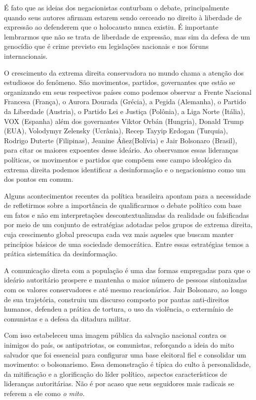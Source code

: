É fato que as ideias dos negacionistas conturbam o debate,
principalmente quando seus autores afirmam estarem sendo cerceado no
direito à liberdade de expressão ao defenderem que o holocausto nunca
existiu. É importante lembrarmos que não se trata de liberdade de
expressão, mas sim da defesa de um genocídio que é crime previsto em
legislações nacionais e nos fóruns internacionais.

O crescimento da extrema direita conservadora no mundo chama a atenção
dos estudiosos do fenômeno. São movimentos, partidos, governantes que
estão se organizando em seus respectivos países como podemos observar a
Frente Nacional Francesa (França), o Aurora Dourada (Grécia), a Pegida
(Alemanha), o Partido da Liberdade (Austria), o Partido Lei e Justiça
(Polônia), a Liga Norte (Itália), VOX (Espanha) além dos governantes
Viktor Orbán (Hungria), Donald Trump (EUA),
Volodymyr Zelensky (Ucrânia), Recep Tayyip Erdogan
(Turquia), Rodrigo Duterte
(Filipinas), Jeanine Áñez(Bolívia) e Jair
Bolsonaro (Brasil), para citar os maiores expoentes desse ideário. Ao
observamos essas lideranças políticas, os movimentos e partidos que
compõem esse campo ideológico da extrema direita podemos identificar a
desinformação e o negacionismo como um dos pontos em comum.

Alguns acontecimentos recentes da política brasileira apontam para a
necessidade de refletirmos sobre a importância de qualificarmos o debate
político com base em fatos e não em interpretações descontextualizadas
da realidade ou falsificadas por meio de um conjunto de estratégias
adotadas pelos grupos de extrema direita, cuja crescimento global
preocupa cada vez mais aqueles que buscam manter princípios básicos de
uma sociedade democrática. Entre essas estratégias temos a prática
sistemática da desinformação.

A comunicação direta com a população é uma das formas empregadas para
que o ideário autoritário prospere e mantenha o maior número de pessoas
sintonizadas com os valores conservadores e até mesmo reacionários. Jair
Bolsonaro, ao longo de sua trajetória, construiu um discurso composto
por pautas anti-direitos humanos, defendeu a prática de tortura, o uso
da violência, o extermínio de comunistas e a defesa da ditadura militar.

Com isso estabeleceu uma imagem pública da salvação nacional contra os
inimigos do país, os antipatriotas, os comunistas, reforçando a ideia do
mito salvador que foi essencial para configurar uma base eleitoral fiel
e consolidar um movimento: o bolsonarismo. Essa demonstração é típica do
culto à personalidade, da mitificação e a glorificação do líder
político, aspectos característicos de lideranças autoritárias. Não é por
acaso que seus seguidores mais radicais se referem a ele como \emph{o
mito.}

